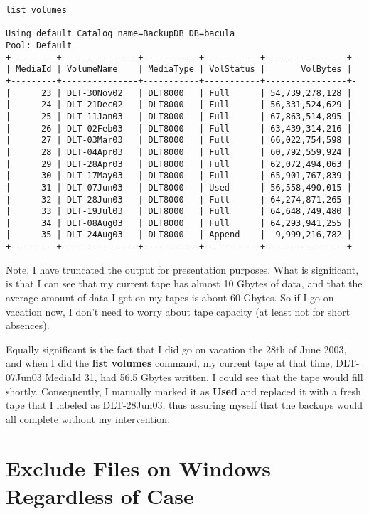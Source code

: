 \footnotesize
\begin{verbatim}
list volumes

Using default Catalog name=BackupDB DB=bacula
Pool: Default
+---------+---------------+-----------+-----------+----------------+-
| MediaId | VolumeName    | MediaType | VolStatus |       VolBytes |
+---------+---------------+-----------+-----------+----------------+-
|      23 | DLT-30Nov02   | DLT8000   | Full      | 54,739,278,128 |
|      24 | DLT-21Dec02   | DLT8000   | Full      | 56,331,524,629 |
|      25 | DLT-11Jan03   | DLT8000   | Full      | 67,863,514,895 |
|      26 | DLT-02Feb03   | DLT8000   | Full      | 63,439,314,216 |
|      27 | DLT-03Mar03   | DLT8000   | Full      | 66,022,754,598 |
|      28 | DLT-04Apr03   | DLT8000   | Full      | 60,792,559,924 |
|      29 | DLT-28Apr03   | DLT8000   | Full      | 62,072,494,063 |
|      30 | DLT-17May03   | DLT8000   | Full      | 65,901,767,839 |
|      31 | DLT-07Jun03   | DLT8000   | Used      | 56,558,490,015 |
|      32 | DLT-28Jun03   | DLT8000   | Full      | 64,274,871,265 |
|      33 | DLT-19Jul03   | DLT8000   | Full      | 64,648,749,480 |
|      34 | DLT-08Aug03   | DLT8000   | Full      | 64,293,941,255 |
|      35 | DLT-24Aug03   | DLT8000   | Append    |  9,999,216,782 |
+---------+---------------+-----------+-----------+----------------+
\end{verbatim}
\normalsize

Note, I have truncated the output for presentation purposes. What is
significant, is that I can see that my current tape has almost 10 Gbytes of
data, and that the average amount of data I get on my tapes is about 60
Gbytes. So if I go on vacation now, I don't need to worry about tape capacity
(at least not for short absences).

Equally significant is the fact that I did go on vacation the 28th of June
2003, and when I did the {\bf list volumes} command, my current tape at that
time, DLT-07Jun03 MediaId 31, had 56.5 Gbytes written. I could see that the
tape would fill shortly. Consequently, I manually marked it as {\bf Used} and
replaced it with a fresh tape that I labeled as DLT-28Jun03, thus assuring
myself that the backups would all complete without my intervention.

\section{Exclude Files on Windows Regardless of Case}
\label{Case}

